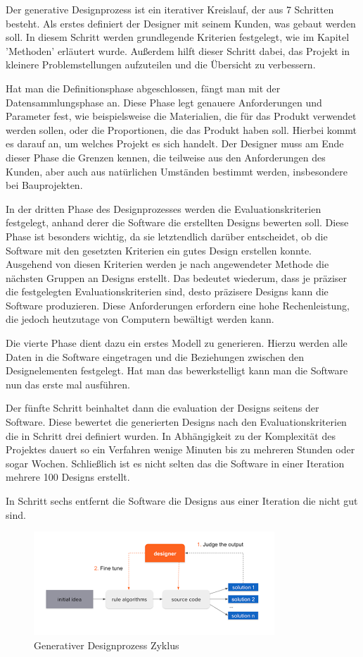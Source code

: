 Der generative Designprozess ist ein iterativer Kreislauf, der aus 7 Schritten besteht. Als erstes definiert der Designer mit seinem Kunden, was gebaut werden soll. In diesem Schritt werden grundlegende Kriterien festgelegt, wie im Kapitel 'Methoden' erläutert wurde. Außerdem hilft dieser Schritt dabei, das Projekt in kleinere Problemstellungen aufzuteilen und die Übersicht zu verbessern.

Hat man die Definitionsphase abgeschlossen, fängt man mit der Datensammlungsphase an. Diese Phase legt genauere Anforderungen und Parameter fest, wie beispielsweise die Materialien, die für das Produkt verwendet werden sollen, oder die Proportionen, die das Produkt haben soll. Hierbei kommt es darauf an, um welches Projekt es sich handelt. Der Designer muss am Ende dieser Phase die Grenzen kennen, die teilweise aus den Anforderungen des Kunden, aber auch aus natürlichen Umständen bestimmt werden, insbesondere bei Bauprojekten.

In der dritten Phase des Designprozesses werden die Evaluationskriterien festgelegt, anhand derer die Software die erstellten Designs bewerten soll. Diese Phase ist besonders wichtig, da sie letztendlich darüber entscheidet, ob die Software mit den gesetzten Kriterien ein gutes Design erstellen konnte. Ausgehend von diesen Kriterien werden je nach angewendeter Methode die nächsten Gruppen an Designs erstellt. Das bedeutet wiederum, dass je präziser die festgelegten Evaluationskriterien sind, desto präzisere Designs kann die Software produzieren. Diese Anforderungen erfordern eine hohe Rechenleistung, die jedoch heutzutage von Computern bewältigt werden kann. 

Die vierte Phase dient dazu ein erstes Modell zu generieren. Hierzu werden alle Daten in die Software eingetragen und die Beziehungen zwischen den Designelementen festgelegt. Hat man das bewerkstelligt kann man die Software nun das erste mal ausführen. 

Der fünfte Schritt beinhaltet dann die evaluation der Designs seitens der Software. Diese bewertet die generierten Designs nach den Evaluationskriterien die in Schritt drei definiert wurden. In Abhängigkeit zu der Komplexität des Projektes dauert so ein Verfahren wenige Minuten bis zu mehreren Stunden oder sogar Wochen. Schließlich ist es nicht selten das die Software in einer Iteration mehrere 100 Designs erstellt. 

In Schritt sechs entfernt die Software die Designs aus einer Iteration die nicht gut sind.

\autocite{12} \autocite{15}

\begin{figure}[h]
  \centering
  \begin{minipage}{0.5\textwidth}
    \centering
    \includegraphics[width=\textwidth]{./images/designprozess.png}
  \end{minipage}
  \caption{Generativer Designprozess Zyklus}
  \label{fig:designprozess}
\end{figure}

